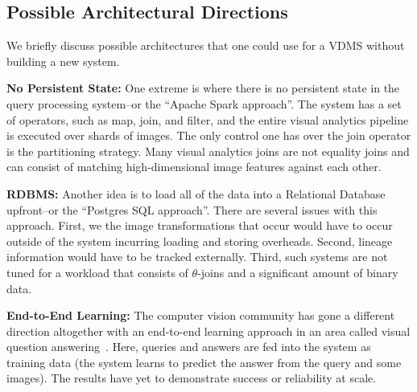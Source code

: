 \subsection{Possible Architectural Directions}
We briefly discuss possible architectures that one could use for a VDMS without building a new system.

\vspace{0.5em} \noindent \textbf{No Persistent State: } One extreme is where there is no persistent state in the query processing system--or the ``Apache Spark approach''. The system has a set of operators, such as map, join, and filter, and the entire visual analytics pipeline is executed over shards of images. The only control one has over the join operator is the partitioning strategy. Many visual analytics joins are not equality joins and can consist of matching high-dimensional image features against each other.

\vspace{0.5em} \noindent \textbf{RDBMS: } Another idea is to load all of the data into a Relational Database upfront--or the ``Postgres SQL approach''. There are several issues with this approach. First, we the image transformations that occur would have to occur outside of the system incurring loading and storing overheads. Second, lineage information would have to be tracked externally. Third, such systems are not tuned for a workload that consists of $\theta$-joins and a significant amount of binary data.

\vspace{0.5em}  \noindent \textbf{End-to-End Learning: } The computer vision community has gone a different direction altogether with an end-to-end learning approach in an area called visual question answering~\cite{ganju2017s}. Here, queries and answers are fed into the system as training data (the system learns to predict the answer from the query and some images). The results have yet to demonstrate success or reliability at scale. 









